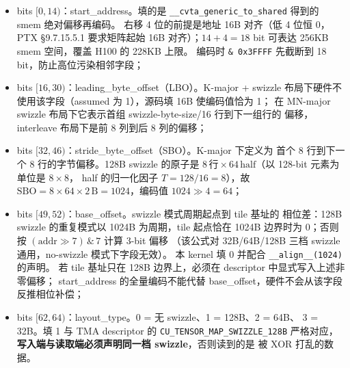 \begin{itemize}
  \item bits $[0, 14)$：start\_address。填的是
        \texttt{\_\allowbreak{}\_\allowbreak{}cvta\_\allowbreak{}generic\_\allowbreak{}to\_\allowbreak{}shared} 得到的 smem 绝对偏移再编码。
        右移 4 位的前提是地址 16B 对齐（低 4 位恒 0，PTX §9.7.15.5.1 要求矩阵起始
        16B 对齐）；$14 + 4 = 18$ bit 可表达 256KB smem 空间，覆盖 H100 的 228KB 上限。
        编码时 \texttt{\& 0x3FFFF} 先截断到 18 bit，防止高位污染相邻字段；
  \item bits $[16, 30)$：leading\_byte\_offset（LBO）。K-major + swizzle
        布局下硬件不使用该字段（assumed 为 1），源码填 16B 使编码值恰为 1；
        在 MN-major swizzle 布局下它表示首组 swizzle-byte-size/16 行到下一组行的
        偏移，interleave 布局下是前 8 列到后 8 列的偏移；
  \item bits $[32, 46)$：stride\_byte\_offset（SBO）。K-major 下定义为
        首个 8 行到下一个 8 行的字节偏移。128B swizzle 的原子是
        $8\,\text{行} \times 64\,\text{half}$（以 128-bit 元素为单位是 $8 \times 8$，
        half 的归一化因子 $T = 128/16 = 8$），故
        $\mathrm{SBO} = 8 \times 64 \times 2\,\mathrm{B} = 1024$，编码值
        $1024 \gg 4 = 64$；
  \item bits $[49, 52)$：base\_offset。swizzle 模式周期起点到 tile 基址的
        相位差：128B swizzle 的重复模式以 1024B 为周期，tile 起点恰在 1024B
        边界时为 0；否则按 $(\mathrm{addr} \gg 7) \,\&\, 7$ 计算 3-bit 偏移
        （该公式对 32B/64B/128B 三档 swizzle 通用，no-swizzle 模式下字段无效）。
        本 kernel 填 0 并配合 \texttt{\_\allowbreak{}\_\allowbreak{}align\_\allowbreak{}\_\allowbreak{}(1024)} 的声明。
        若 tile 基址只在 128B 边界上，必须在 descriptor 中显式写入上述非零偏移；
        start\_address 的全量编码不能代替 base\_offset，硬件不会从该字段反推相位补偿；
  \item bits $[62, 64)$：layout\_type。0 = 无 swizzle、1 = 128B、2 = 64B、
        3 = 32B。填 1 与 TMA descriptor 的 \texttt{CU\_\allowbreak{}TENSOR\_\allowbreak{}MAP\_\allowbreak{}SWIZZLE\_\allowbreak{}128\allowbreak{}B}
        严格对应，\textbf{写入端与读取端必须声明同一档 swizzle}，否则读到的是
        被 XOR 打乱的数据。
\end{itemize}

